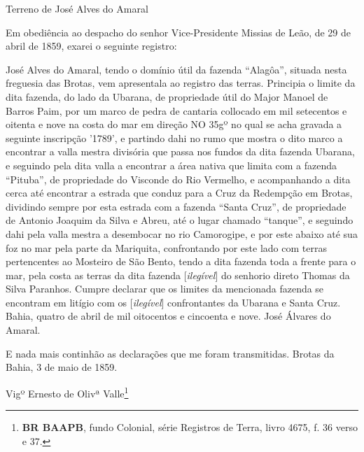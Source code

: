 \begin{citacao}
\begin{citacao}
Terreno de José Alves do Amaral

Em obediência ao despacho do senhor Vice-Presidente Missias de Leão, de 29 de abril de 1859, exarei o seguinte registro:

José Alves do Amaral, tendo o domínio útil da fazenda ``Alagôa'', situada nesta freguesia das Brotas, vem apresentala ao registro das terras. Principia o limite da dita fazenda, do lado da Ubarana, de propriedade útil do Major Manoel de Barros Paim, por um marco de pedra de cantaria collocado em mil setecentos e oitenta e nove na costa do mar em direção NO 35gº no qual se acha gravada a seguinte inscripção '1789', e partindo dahi no rumo que mostra o dito marco a encontrar a valla mestra divisória que passa nos fundos da dita fazenda Ubarana, e seguindo pela dita valla a encontrar a área nativa que limita com a fazenda ``Pituba'', de propriedade do Visconde do Rio Vermelho, e acompanhando a dita cerca até encontrar a estrada que conduz para a Cruz da Redempção em Brotas, dividindo sempre por esta estrada com a fazenda ``Santa Cruz'', de propriedade de Antonio Joaquim da Silva e Abreu, até o lugar chamado ``tanque'', e seguindo dahi pela valla mestra a desembocar no rio Camorogipe, e por este abaixo até sua foz no mar pela parte da Mariquita, confrontando por este lado com terras pertencentes ao Mosteiro de São Bento, tendo a dita fazenda toda a frente para o mar, pela costa as terras da dita fazenda [\textit{ilegível}] do senhorio direto Thomas da Silva Paranhos. Cumpre declarar que os limites da mencionada fazenda se encontram em litígio com os [\textit{ilegível}] confrontantes da Ubarana e Santa Cruz. Bahia, quatro de abril de mil oitocentos e cincoenta e nove. José Álvares do Amaral.

E nada mais continhão as declarações que me foram transmitidas. Brotas da Bahia, 3 de maio de 1859.

Vigº Ernesto de Olivª Valle\footnote{\textbf{BR BAAPB}, fundo Colonial, série Registros de Terra, livro 4675, f. 36 verso e 37.}
\end{citacao}


\end{citacao}

